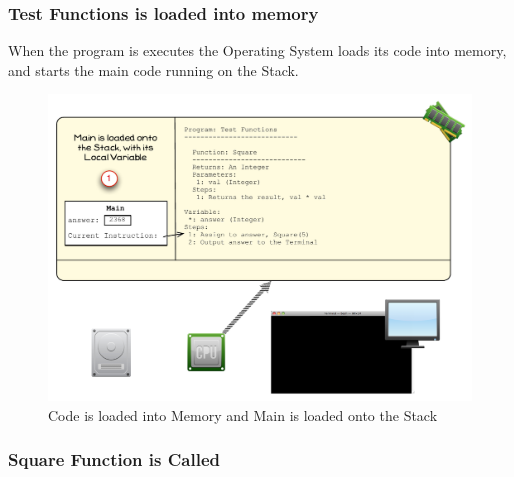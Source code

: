 \clearpage
\subsubsection{Test Functions is loaded into memory} %
\label{ssub:test_functions_is_loaded_into_memory}

When the program is executes the Operating System loads its code into memory, and starts the main code running on the Stack.

\begin{figure}[htbp]
   \centering
   \includegraphics[width=\textwidth]{./topics/storing-using-data/images/vis-func-1} 
   \caption{Code is loaded into Memory and Main is loaded onto the Stack}
   \label{fig:vis-func-1}
\end{figure}



\clearpage

\subsubsection{Square Function is Called} %
\label{ssub:square_function_is_called}

